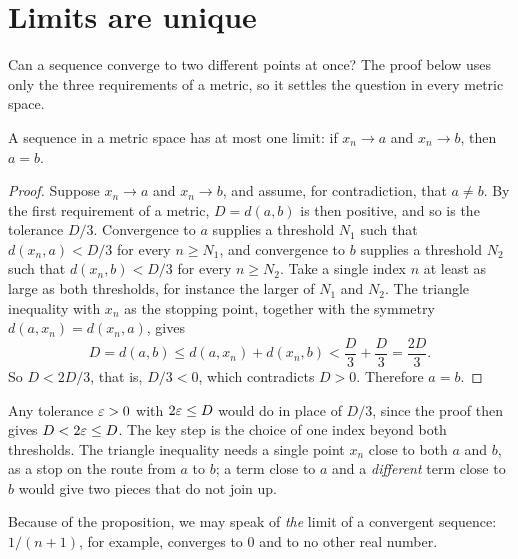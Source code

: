 \section{Limits are unique}\label{ch11:sec:unique}
Can a sequence converge to two different points at once? The proof below uses only the three requirements of a metric, so it settles the question in every metric space.
\par\noindent\begin{minipage}{\linewidth}
\begin{proposition}\label{thm:limitunique}
A sequence in a metric space has at most one limit: if $x_n\to a$ and $x_n\to b$, then $a=b$.
\end{proposition}
\end{minipage}\par

\begin{proof}
Suppose $x_n\to a$ and $x_n\to b$, and assume, for contradiction, that $a\ne b$. By the first requirement of a metric, $D=d(a,b)$ is then positive, and so is the tolerance $D/3$. Convergence to $a$ supplies a threshold $N_1$ such that $d(x_n,a)<D/3$ for every $n\ge N_1$, and convergence to $b$ supplies a threshold $N_2$ such that $d(x_n,b)<D/3$ for every $n\ge N_2$. Take a single index $n$ at least as large as both thresholds, for instance the larger of $N_1$ and $N_2$. The triangle inequality with $x_n$ as the stopping point, together with the symmetry $d(a,x_n)=d(x_n,a)$, gives
\[
D=d(a,b)\le d(a,x_n)+d(x_n,b)<\frac D3+\frac D3=\frac{2D}3.
\]
So $D<2D/3$, that is, $D/3<0$, which contradicts $D>0$. Therefore $a=b$.
\end{proof}

Any tolerance $\varepsilon>0$ with $2\varepsilon\le D$ would do in place of $D/3$, since the proof then gives $D<2\varepsilon\le D$. The key step is the choice of one index beyond both thresholds. The triangle inequality needs a single point $x_n$ close to both $a$ and $b$, as a stop on the route from $a$ to $b$; a term close to $a$ and a \emph{different} term close to $b$ would give two pieces that do not join up.

Because of the proposition, we may speak of \emph{the} limit of a convergent sequence: $1/(n+1)$, for example, converges to $0$ and to no other real number.
